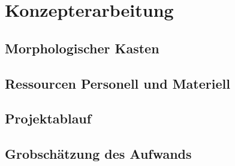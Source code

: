 \section{Konzepterarbeitung}

\subsection{Morphologischer Kasten}

\subsection{Ressourcen Personell und Materiell}

\subsection{Projektablauf}

\subsection{Grobschätzung des Aufwands}
